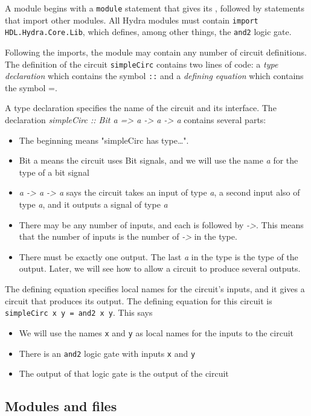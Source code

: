 \documentclass[11pt]{article}
\begin{document}
A module begins with a \texttt{module} statement that gives its , followed by
statements that import other modules.  All Hydra modules must contain
\texttt{import HDL.Hydra.Core.Lib}, which defines, among other things, the
\texttt{and2} logic gate.

Following the imports, the module may contain any number of circuit
definitions.  The definition of the circuit \texttt{simpleCirc} contains two lines
of code: a \emph{type declaration} which contains the symbol \texttt{::} and a
\emph{defining equation} which contains the symbol =.

A type declaration specifies the name of the circuit and its
interface.  The declaration \emph{simpleCirc :: Bit a => a -> a -> a} contains
several parts:

\begin{itemize}
\item The beginning  means "simpleCirc has type\ldots{}".
\item Bit a    means the circuit uses Bit signals, and we will use the
name \emph{a} for the type of a bit signal
\item \emph{a -> a -> a} says the circuit takes an input of type \emph{a}, a second
input also of type \emph{a}, and it outputs a signal of type \emph{a}
\item There may be any number of inputs, and each is followed by \emph{->}.
This means that the number of inputs is the number of \emph{->} in the
type.
\item There must be exactly one output.  The last \emph{a} in the type is the
type of the output.  Later, we will see how to allow a circuit to
produce several outputs.
\end{itemize}

The defining equation specifies local names for the circuit's inputs,
and it gives a circuit that produces its output.  The defining
equation for this circuit is \texttt{simpleCirc x y = and2 x y}.  This says
\begin{itemize}
\item We will use the names \texttt{x} and \texttt{y} as local names for the inputs to
the circuit
\item There is an \texttt{and2} logic gate with inputs \texttt{x} and \texttt{y}
\item The output of that logic gate is the output of the circuit
\end{itemize}

\subsection{Modules and files}
\label{sec:org3067e4b}
\end{document}
